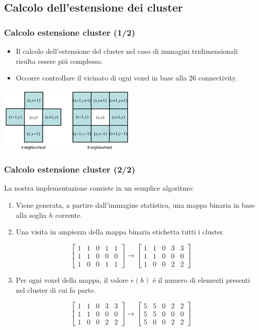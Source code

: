 \documentclass{beamer}
\begin{document}
\subsection{Calcolo dell'estensione dei cluster}

\begin{frame}
\frametitle{Calcolo estensione cluster (1/2)}
\begin{itemize}
\item Il calcolo dell'estensione del cluster nel caso di immagini tridimensionali risulta essere pi\'u complesso.
\item Occorre controllare il vicinato di ogni voxel in base alla \alert{26 connectivity}.
\end{itemize}
\center
\includegraphics[width=250px]{Images/connectivity.png}
\end{frame}

\begin{frame}
\frametitle{Calcolo estensione cluster (2/2)}
La nostra implementazione consiste in un semplice algoritmo:
\begin{enumerate}
\item Viene generata, a partire dall'immagine statistica, una mappa binaria in base alla soglia $h$ corrente.
\item Una visita in ampiezza della mappa binaria etichetta tutti i cluster.
\end{enumerate}
\[
\begin{bmatrix}
    1       & 1 & 0 & 1 & 1\\
    1       & 1 & 0 & 0 & 0 \\
    1       & 0 & 0 & 1 & 1
\end{bmatrix}
\rightarrow
\begin{bmatrix}
    1       & 1 & 0 & 3 & 3\\
    1       & 1 & 0 & 0 & 0 \\
    1       & 0 & 0 & 2 & 2
\end{bmatrix}
\]
\begin{enumerate}
\setcounter{enumi}{2}
\item Per ogni voxel della mappa, il valore $e(h)$ \'e il numero di elementi presenti nel cluster di cui fa parte.
\end{enumerate}
\[
\begin{bmatrix}
    1       & 1 & 0 & 3 & 3\\
    1       & 1 & 0 & 0 & 0 \\
    1       & 0 & 0 & 2 & 2
\end{bmatrix}
\rightarrow
\begin{bmatrix}
    5       & 5 & 0 & 2 & 2 \\
    5       & 5 & 0 & 0 & 0 \\
    5       & 0 & 0 & 2 & 2
\end{bmatrix}
\]

\end{frame}
\end{document}
